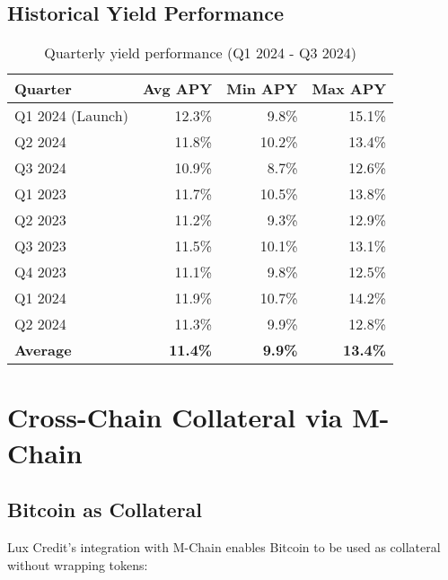 \documentclass[11pt,a4paper]{article}
\begin{document}
\subsection{Historical Yield Performance}

\begin{table}[h]
\centering
\begin{tabular}{@{}lrrr@{}}
\toprule
\textbf{Quarter} & \textbf{Avg APY} & \textbf{Min APY} & \textbf{Max APY} \\ \midrule
Q1 2024 (Launch) & 12.3\% & 9.8\% & 15.1\% \\
Q2 2024 & 11.8\% & 10.2\% & 13.4\% \\
Q3 2024 & 10.9\% & 8.7\% & 12.6\% \\
Q1 2023 & 11.7\% & 10.5\% & 13.8\% \\
Q2 2023 & 11.2\% & 9.3\% & 12.9\% \\
Q3 2023 & 11.5\% & 10.1\% & 13.1\% \\
Q4 2023 & 11.1\% & 9.8\% & 12.5\% \\
Q1 2024 & 11.9\% & 10.7\% & 14.2\% \\
Q2 2024 & 11.3\% & 9.9\% & 12.8\% \\ \midrule
\textbf{Average} & \textbf{11.4\%} & \textbf{9.9\%} & \textbf{13.4\%} \\ \bottomrule
\end{tabular}
\caption{Quarterly yield performance (Q1 2024 - Q3 2024)}
\end{table}

\section{Cross-Chain Collateral via M-Chain}

\subsection{Bitcoin as Collateral}

Lux Credit's integration with M-Chain enables Bitcoin to be used as collateral without wrapping tokens:
\end{document}
